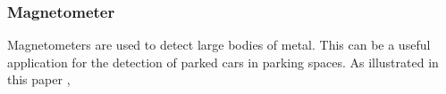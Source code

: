 \subsubsection*{Magnetometer}
Magnetometers are used to detect large bodies of metal. This can be a useful application for the detection of parked cars in parking spaces. As illustrated in this paper \citep{angelis_simple_2016}, 